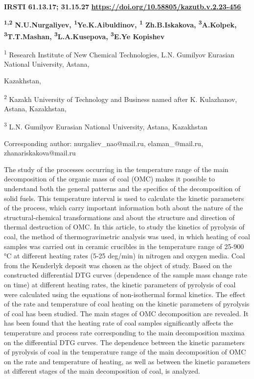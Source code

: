 \newpage
{}
{\bfseries IRSTI 61.13.17; 31.15.27}
\hfill {\bfseries \href{https://doi.org/10.58805/kazutb.v.2.23-456}{https://doi.org/10.58805/kazutb.v.2.23-456}}


\begin{center}
    {\bfseries \textsuperscript{1,2} N.U.Nurgaliyev\envelope, \textsuperscript{1}Ye.K.Aibuldinov\envelope, \textsuperscript{1} Zh.B.Iskakova\envelope, \textsuperscript{3}A.Kolpek, \textsuperscript{3}T.T.Mashan, \textsuperscript{3}L.A.Kusepova, \textsuperscript{3}E.Ye Kopishev}

\textsuperscript{1} Research Institute of New Chemical Technologies,
L.N. Gumilyov Eurasian National University, Astana,

Kazakhstan,

\textsuperscript{2} Kazakh University of Technology and Business named
after K. Kulazhanov, Astana, Kazakhstan,

\textsuperscript{3} L.N. Gumilyov Eurasian National University, Astana,
Kazakhstan

\envelope Corresponding author: nurgaliev\_nao@mail.ru, elaman\_@mail.ru,
zhanariskakova@mail.ru
\end{center}

The study of the processes occurring in the temperature range of the
main decomposition of the organic mass of coal (OMC) makes it possible
to understand both the general patterns and the specifics of the
decomposition of solid fuels. This temperature interval is used to
calculate the kinetic parameters of the process, which carry important
information both about the nature of the structural-chemical
transformations and about the structure and direction of thermal
destruction of OMC. In this article, to study the kinetics of pyrolysis
of coal, the method of thermogravimetric analysis was used, in which
heating of coal samples was carried out in ceramic crucibles in the
temperature range of 25-900 °C at different heating rates (5-25 deg/min)
in nitrogen and oxygen media. Coal from the Kenderlyk deposit was chosen
as the object of study. Based on the constructed differential DTG curves
(dependence of the sample mass change rate on time) at different heating
rates, the kinetic parameters of pyrolysis of coal were calculated using
the equations of non-isothermal formal kinetics. The effect of the rate
and temperature of coal heating on the kinetic parameters of pyrolysis
of coal has been studied. The main stages of OMC decomposition are
revealed. It has been found that the heating rate of coal samples
significantly affects the temperature and process rate corresponding to
the main decomposition maxima on the differential DTG curves. The
dependence between the kinetic parameters of pyrolysis of coal in the
temperature range of the main decomposition of OMC on the rate and
temperature of heating, as well as between the kinetic parameters at
different stages of the main decomposition of coal, is analyzed.

